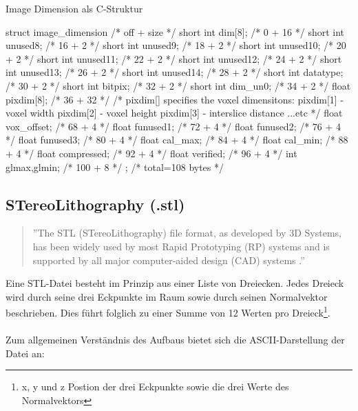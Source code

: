 \begin{program}[H]
	\caption{Image Dimension als C-Struktur \citep{AnalyzeFormat}}
	\label{prog:imageDim}
	\begin{CCode}
struct image_dimension
{ /* off + size */
	short int dim[8]; /* 0 + 16 */
	short int unused8; /* 16 + 2 */
	short int unused9; /* 18 + 2 */
	short int unused10; /* 20 + 2 */
	short int unused11; /* 22 + 2 */
	short int unused12; /* 24 + 2 */
	short int unused13; /* 26 + 2 */
	short int unused14; /* 28 + 2 */
	short int datatype; /* 30 + 2 */
	short int bitpix; /* 32 + 2 */
	short int dim_un0; /* 34 + 2 */
	float pixdim[8]; /* 36 + 32 */
	/*
	pixdim[] specifies the voxel dimensitons:
	pixdim[1] - voxel width
	pixdim[2] - voxel height
	pixdim[3] - interslice distance
	...etc
	*/
	float vox_offset; /* 68 + 4 */
	float funused1; /* 72 + 4 */
	float funused2; /* 76 + 4 */
	float funused3; /* 80 + 4 */
	float cal_max; /* 84 + 4 */
	float cal_min; /* 88 + 4 */
	float compressed; /* 92 + 4 */
	float verified; /* 96 + 4 */
	int glmax,glmin; /* 100 + 8 */
}; /* total=108 bytes */ 
	\end{CCode}
\end{program}

\subsection{STereoLithography (.stl)}
\label{sec:stl}
\begin{quote}
	''The STL (STereoLithography) file format, as developed by 3D Systems, has been widely used by most Rapid Prototyping (RP) systems and is supported by all major computer-aided design (CAD) systems \citep{STereoLithography}.''
\end{quote}
Eine STL-Datei besteht im Prinzip aus einer Liste von Dreiecken. Jedes Dreieck wird durch seine drei Eckpunkte im Raum sowie durch seinen Normalvektor beschrieben. Dies führt folglich zu einer Summe von 12 Werten pro Dreieck\footnote{x, y und z Postion der drei Eckpunkte sowie die drei Werte des Normalvektors}.\\
\\
Zum allgemeinen Verständnis des Aufbaus bietet sich die ASCII-Darstellung der Datei an:

